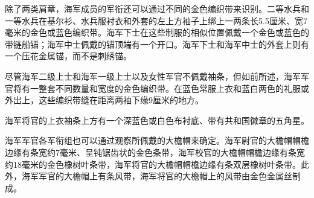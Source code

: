 除了两类肩章，海军成员的军衔还可以通过不同的金色编织带来识别。二等水兵和一等水兵在基尔衫、水兵服衬衣和外套的左上方袖子上绑上一两条长5.5厘米、宽7毫米的金色或蓝色编织带。海军下士在这些制服的相似位置佩戴一个金色或蓝色的带链船锚；海军中士佩戴的锚顶端有一个开口。海军下士和海军中士的外套上则有一个压花金属锚，而不是刺绣锚。

尽管海军二级上士和海军一级上士以及女性军官不佩戴袖条，但如前所述，海军军官将有一整套不同数量和宽度的金色编织带。在蓝色常服上衣和蓝白两色的礼服或外出上，这些编织带缝在距离两袖下缘9厘米的地方。

海军将官的上衣袖条上方有一个深蓝色或白色布衬底、带有共和国徽章的五角星。

海军军官各军衔组也可以通过观察所佩戴的大檐帽来确定。海军尉官的大檐帽帽檐边缘有条宽约7毫米、呈钝锯齿状的金色条带，海军校官的大檐帽帽檐边缘有条宽约18毫米的金色橡树叶条带，海军将官的大檐帽帽檐边缘有条双层橡树叶条带。此外，海军军官的大檐帽上有条风带，海军将官的大檐帽上的风带由金色金属丝制成。

